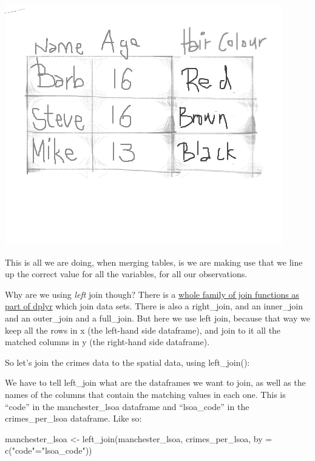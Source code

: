 \documentclass[
]{book}
\newenvironment{Shaded}{\begin{snugshade}}{\end{snugshade}}
\newcommand{\AttributeTok}[1]{\textcolor[rgb]{0.77,0.63,0.00}{#1}}
\newcommand{\FunctionTok}[1]{\textcolor[rgb]{0.00,0.00,0.00}{#1}}
\newcommand{\NormalTok}[1]{#1}
\newcommand{\OtherTok}[1]{\textcolor[rgb]{0.56,0.35,0.01}{#1}}
\newcommand{\StringTok}[1]{\textcolor[rgb]{0.31,0.60,0.02}{#1}}
\begin{document}
\includegraphics{img/merge_logic_2.png}

This is all we are doing, when merging tables, is we are making use that we line up the correct value for all the variables, for all our observations.

Why are we using \emph{left} join though? There is a \href{http://stat545.com/bit001_dplyr-cheatsheet.html}{whole family of join functions as part of dplyr} which join data sets. There is also a right\_join, and an inner\_join and an outer\_join and a full\_join. But here we use left join, because that way we keep all the rows in x (the left-hand side dataframe), and join to it all the matched columns in y (the right-hand side dataframe).

So let's join the crimes data to the spatial data, using left\_join():

We have to tell left\_join what are the dataframes we want to join, as well as the names of the columns that contain the matching values in each one. This is ``code'' in the manchester\_lsoa dataframe and ``lsoa\_code'' in the crimes\_per\_lsoa dataframe. Like so:

\begin{Shaded}
\begin{Highlighting}[]
\NormalTok{manchester\_lsoa }\OtherTok{\textless{}{-}} \FunctionTok{left\_join}\NormalTok{(manchester\_lsoa, crimes\_per\_lsoa, }\AttributeTok{by =} \FunctionTok{c}\NormalTok{(}\StringTok{"code"}\OtherTok{=}\StringTok{"lsoa\_code"}\NormalTok{))}
\end{Highlighting}
\end{Shaded}
\end{document}
